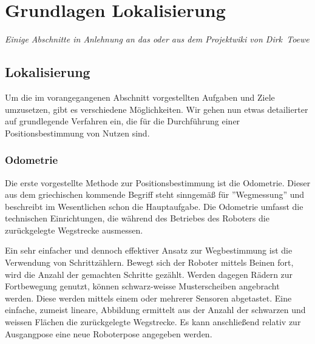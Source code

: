 \section{Grundlagen Lokalisierung}
\label{lokalisierung_grundlagen_sec}
\authorsection{\editoranne}
\begin{flushright}\textit{Einige Abschnitte in Anlehnung an das oder aus dem Projektwiki von Dirk~Toewe}\end{flushright}
\subsection{Lokalisierung}
Um die im vorangegangenen Abschnitt vorgestellten Aufgaben und Ziele umzusetzen, gibt es verschiedene Möglichkeiten. Wir gehen nun etwas detailierter auf grundlegende Verfahren ein, die für die Durchführung einer Positionsbestimmung von Nutzen sind.
 
\subsubsection{Odometrie}
Die erste vorgestellte Methode zur Positionsbestimmung ist die Odometrie. Dieser aus dem griechischen kommende Begriff steht sinngemäß für ''Wegmessung'' und beschreibt im Wesentlichen schon die Hauptaufgabe. Die Odometrie umfasst die technischen Einrichtungen, die während des Betriebes des Roboters die zurückgelegte Wegstrecke ausmessen.

Ein sehr einfacher und dennoch effektiver Ansatz zur Wegbestimmung ist die Verwendung von Schrittzählern. Bewegt sich der Roboter mittels Beinen fort, wird die Anzahl der gemachten Schritte gezählt. Werden dagegen Rädern  zur Fortbewegung genutzt, können schwarz-weisse Musterscheiben angebracht werden. Diese werden mittels einem oder mehrerer Sensoren abgetastet. Eine einfache, zumeist lineare, Abbildung ermittelt aus der Anzahl der schwarzen und weissen Flächen die zurückgelegte Wegstrecke. Es kann anschließend relativ zur Ausgangpose eine neue Roboterpose angegeben werden.

